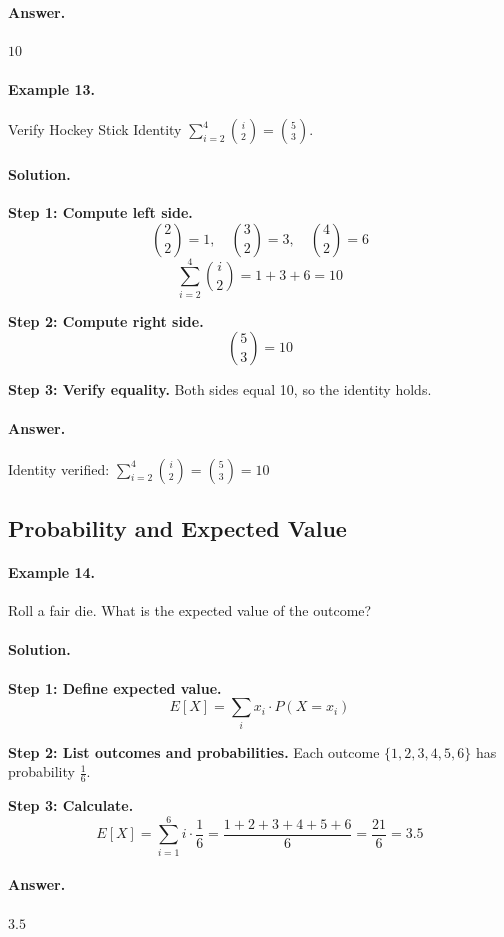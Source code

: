 \documentclass[12pt]{extarticle}
\begin{document}
\paragraph{Answer.} $\boxed{10}$

\paragraph{Example 13.} Verify Hockey Stick Identity $\sum_{i=2}^{4}\binom{i}{2} = \binom{5}{3}$.

\paragraph{Solution.}
\textbf{Step 1: Compute left side.}
\[
\binom{2}{2} = 1, \quad \binom{3}{2} = 3, \quad \binom{4}{2} = 6
\]
\[
\sum_{i=2}^{4}\binom{i}{2} = 1 + 3 + 6 = 10
\]

\textbf{Step 2: Compute right side.}
\[
\binom{5}{3} = 10
\]

\textbf{Step 3: Verify equality.} Both sides equal 10, so the identity holds.

\paragraph{Answer.} Identity verified: $\boxed{\sum_{i=2}^{4}\binom{i}{2} = \binom{5}{3} = 10}$

\subsection{Probability and Expected Value}

\paragraph{Example 14.} Roll a fair die. What is the expected value of the outcome?

\paragraph{Solution.}
\textbf{Step 1: Define expected value.} 
\[
E[X] = \sum_{i} x_i \cdot P(X = x_i)
\]

\textbf{Step 2: List outcomes and probabilities.} Each outcome $\{1,2,3,4,5,6\}$ has probability $\frac{1}{6}$.

\textbf{Step 3: Calculate.}
\[
E[X] = \sum_{i=1}^{6} i \cdot \frac{1}{6} = \frac{1+2+3+4+5+6}{6} = \frac{21}{6} = 3.5
\]

\paragraph{Answer.} $\boxed{3.5}$
\end{document}
